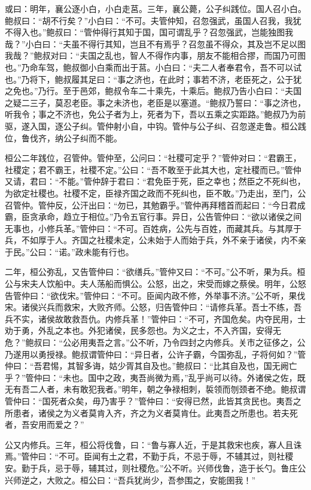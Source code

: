 \documentclass[]{article}
\begin{document}
或曰：明年，襄公逐小白，小白走莒。三年，襄公薨，公子纠践位。国人召小白。鲍叔曰：``胡不行矣？''小白曰：``不可。夫管仲知，召忽强武，虽国人召我，我犹不得入也。''鲍叔曰：``管仲得行其知于国，国可谓乱乎？召忽强武，岂能独图我哉？''小白曰：``夫虽不得行其知，岂且不有焉乎？召忽虽不得众，其及岂不足以图我哉？''鲍叔对曰：``夫国之乱也，智人不得作内事，朋友不能相合摎，而国乃可图也。''乃命车驾，鲍叔御小白乘而出于莒。小白曰：``夫二人者奉君令，吾不可以试也。''乃将下，鲍叔履其足曰：``事之济也，在此时；事若不济，老臣死之，公于犹之免也。''乃行。至于邑郊，鲍叔令车二十乘先，十乘后。鲍叔乃告小白曰：``夫国之疑二三子，莫忍老臣。事之未济也，老臣是以塞道。``鲍叔乃誓曰：``事之济也，听我令；事之不济也，免公子者为上，死者为下，吾以五乘之实距路。''鲍叔乃为前驱，遂入国，逐公子纠。管仲射小自，中钩。管仲与公子纠、召忽遂走鲁。桓公践位，鲁伐齐，纳公子纠而不能。

桓公二年践位，召管仲。管仲至，公问曰：``社稷可定乎？''管仲对曰：``君霸王，社稷定；君不霸王，社稷不定。''公曰：``吾不敢至于此其大也，定社稷而已。''管仲又请，君曰：``不能。''管仲辞于君曰：``君免臣于死，臣之幸也；然臣之不死纠也，为欲定社稷也。社稷不定，臣禄齐国之政而不死纠也，臣不敢。''乃走出，至门，公召管仲。管仲反，公汗出曰：``勿已，其勉霸乎。''管仲再拜稽首而起曰：``今日君成霸，臣贪承命，趋立于相位。''乃令五官行事。异日，公告管仲曰：``欲以诸侯之间无事也，小修兵革。''管仲曰：``不可。百姓病，公先与百姓，而藏其兵。与其厚于兵，不如厚于人。齐国之社稷未定，公未始于人而始于兵，外不亲于诸侯，内不亲于民。''公曰：``诺。''政未能有行也。

二年，桓公弥乱，又告管仲曰：``欲缮兵。''管仲又曰：``不可。''公不听，果为兵。桓公与宋夫人饮船中。夫人荡船而惧公。公怒，出之，宋受而嫁之蔡侯。明年，公怒告管仲曰：``欲伐宋。''管仲曰：``不可。臣闻内政不修，外举事不济。''公不听，果伐宋。诸侯兴兵而救宋，大败齐师。公怒，归告管仲曰：``请修兵革。吾士不练，吾兵不实，诸侯故敢救吾仇。内修兵革！''管仲曰：``不可，齐国危矣。内夺民用，士劝于勇，外乱之本也。外犯诸侯，民多怨也。为义之士，不入齐国，安得无危？''鲍叔曰：``公必用夷吾之言。''公不听，乃令四封之内修兵。关市之征侈之，公乃遂用以勇授禄。鲍叔谓管仲曰：``异日者，公许子霸，今国弥乱，子将何如？''管仲曰：``吾君惕，其智多诲，姑少胥其自及也。''鲍叔曰：``比其自及也，国无阙亡乎？''管仲曰：``未也。国中之政，夷吾尚微为焉，''乱乎尚可以待。外诸侯之佐，既无有吾二人者，未有敢犯我者。''明年，朝之争禄相刺，裚领而刎颈者不绝。鲍叔谓管仲曰：``国死者众矣，毋乃害乎？''管仲曰：``安得已然，此皆其贪民也。夷吾之所患者，诸侯之为义者莫肯入齐，齐之为义者莫肯仕。此夷吾之所患也。若夫死者，吾安用而爱之？''

公又内修兵。三年，桓公将伐鲁，曰：``鲁与寡人近，于是其救宋也疾，寡人且诛焉。''管仲曰：``不可。臣闻有土之君，不勤于兵，不忌于辱，不辅其过，则社稷安。勤于兵，忌于辱，辅其过，则社稷危。''公不听。兴师伐鲁，造于长勺。鲁庄公兴师逆之，大败之。桓公曰：``吾兵犹尚少，吾参围之，安能圉我！''
\end{document}
